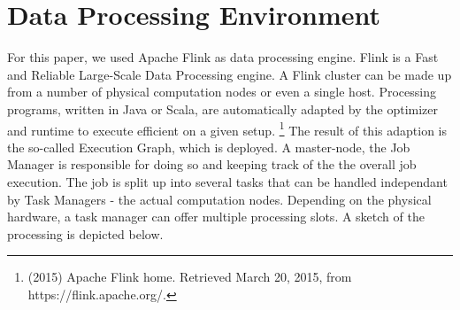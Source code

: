 \section{Data Processing Environment}
For this paper, we used Apache Flink as data processing engine. Flink is a Fast and Reliable
Large-Scale Data Processing engine. A Flink cluster can be made up from a number of physical
computation nodes or even a single host. Processing programs, written in Java or Scala, are
automatically adapted by the optimizer and runtime to execute efficient on a given setup.
\footnote{(2015) Apache Flink home. Retrieved March 20, 2015, from https://flink.apache.org/.}
The result of this adaption is the so-called Execution Graph, which is deployed. A master-node, the
Job Manager is responsible for doing so and keeping track of the the overall job execution. The job
is split up into several tasks that can be handled independant by Task Managers - the actual
computation nodes.  Depending on the physical hardware, a task manager can offer multiple processing
slots. A sketch of the processing is depicted below.

